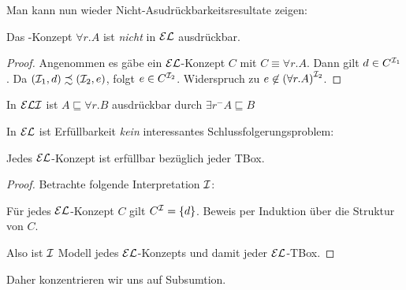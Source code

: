 Man kann nun wieder Nicht-Asudrückbarkeitsresultate zeigen:
\begin{lemma}
    Das \ALC-Konzept $\forall r.A$ ist \emph{nicht} in $\mathcal{E}\mathcal{L}$ ausdrückbar.
\end{lemma}
\begin{tafel}[continues=t:63]
    \begin{proof}
        Angenommen es gäbe ein $\mathcal{E}\mathcal{L}$-Konzept $C$ mit $C \equiv \forall r.A$.
        Dann gilt $d \in C^{\mathcal{I}_1}$. Da $(\mathcal{I}_1, d) \precsim (\mathcal{I}_2, e)$,
        folgt $e \in C^{\mathcal{I}_2}$. Widerspruch zu $e \not\in {(\forall
        r.A)}^{\mathcal{I}_2}$.
    \end{proof}
    In $\mathcal{E}\mathcal{L}\mathcal{I}$ ist $A \sqsubseteq \forall r.B$ ausdrückbar durch $\exists r^- A \sqsubseteq B$
\end{tafel}

In $\mathcal{E}\mathcal{L}$ ist Erfüllbarkeit \emph{kein} interessantes Schlussfolgerungsproblem:

\begin{lemma}
    Jedes $\mathcal{E}\mathcal{L}$-Konzept ist erfüllbar bezüglich jeder TBox.
\end{lemma}

\begin{tafel}\mbox{}
    \begin{proof}
    Betrachte folgende Interpretation $\mathcal{I}$:

\begin{center}
    \end{center}

Für jedes $\mathcal{E}\mathcal{L}$-Konzept $C$ gilt $C^{\mathcal{I}} = \{d\}$. Beweis per Induktion über
die Struktur von $C$.

Also ist $\mathcal{I}$ Modell jedes $\mathcal{E}\mathcal{L}$-Konzepts und damit jeder $\mathcal{E}\mathcal{L}$-TBox.
\end{proof}
\end{tafel}

Daher konzentrieren wir uns auf Subsumtion.

